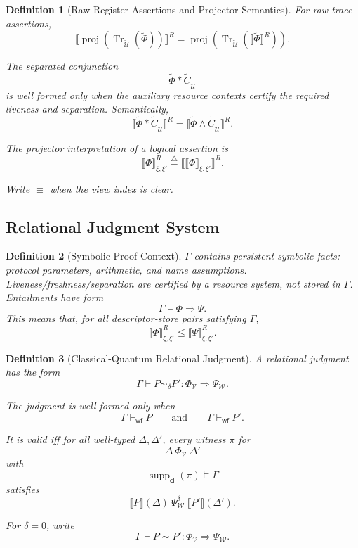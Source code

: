 \documentclass[acmsmall,screen,review,anonymous,nonacm]{acmart}
\newtheorem{definition}{Definition}[section]
\theoremstyle{defn_style}
\begin{document}
\begin{definition}[Raw Register Assertions and Projector Semantics]
For raw trace assertions,
\[
\llbracket
\operatorname{proj}\!\left(
\operatorname{Tr}_{\widetilde{\mathcal U}}(\widetilde{\Phi})
\right)
\rrbracket^R
=
\operatorname{proj}
\left(
\operatorname{Tr}_{\widetilde{\mathcal U}}
\left(
\llbracket\widetilde{\Phi}\rrbracket^R
\right)
\right).
\]

The separated conjunction
\[
\widetilde{\Phi} * \widetilde C_{\widetilde{\mathcal U}}
\]
is well formed only when the auxiliary resource contexts certify the required
liveness and separation. Semantically,
\[
\llbracket
\widetilde{\Phi} * \widetilde C_{\widetilde{\mathcal U}}
\rrbracket^R
=
\llbracket\widetilde{\Phi}\land
\widetilde C_{\widetilde{\mathcal U}}\rrbracket^R .
\]

The projector interpretation of a logical assertion is
\[
\llbracket \Phi\rrbracket^R_{\xi,\xi'}
\stackrel{\triangle}{=}
\llbracket
\llbracket \Phi\rrbracket_{\xi,\xi'}
\rrbracket^R .
\]

Write \(\equiv\) when the view index is clear.
\end{definition}

    
\subsection{\textbf{Relational Judgment System}}
\begin{definition}[Symbolic Proof Context]
\(\Gamma\) contains persistent symbolic facts: protocol parameters, arithmetic,
and name assumptions. Liveness/freshness/separation are
certified by a resource system, not stored in \(\Gamma\). Entailments have form
\[
\Gamma\vDash \Phi\Longrightarrow\Psi.
\]
This means that, for all descriptor-store pairs satisfying \(\Gamma\),
\[
\llbracket\Phi\rrbracket^R_{\xi,\xi'}
\le
\llbracket\Psi\rrbracket^R_{\xi,\xi'} .
\]
\end{definition}

\begin{definition}[Classical-Quantum Relational Judgment]
    A relational judgment has the form
    \[
    \Gamma
    \vdash
    P\sim_{\delta}P'
    :
    \Phi_{\mathcal V}
    \Longrightarrow
    \Psi_{\mathcal W}.
    \]
    
    The judgment is well formed only when
    \[
    \Gamma\vdash_{\mathsf{wf}} P
    \qquad
    \text{and}
    \qquad
    \Gamma\vdash_{\mathsf{wf}} P'.
    \]
    
    It is valid iff for all well-typed \(\Delta,\Delta'\), every witness \(\pi\)
    for
    \[
    \Delta\ \Phi_{\mathcal V}\ \Delta'
    \]
    with
    \[
    \operatorname{supp}_{\mathsf{cl}}(\pi)\models\Gamma
    \]
    satisfies
    \[
    \llbracket P\rrbracket(\Delta)
    \ \Psi_{\mathcal W}^{\delta}\
    \llbracket P'\rrbracket(\Delta').
    \]
    
    For \(\delta=0\), write
    \[
    \Gamma
    \vdash
    P\sim P'
    :
    \Phi_{\mathcal V}
    \Longrightarrow
    \Psi_{\mathcal W}.
    \]
    \end{definition}
\end{document}
